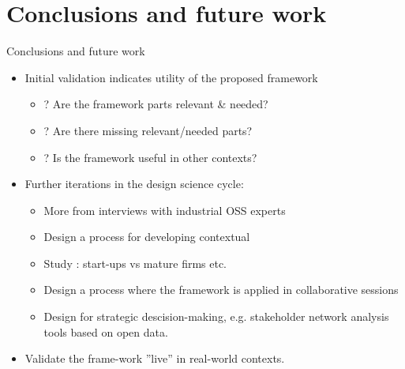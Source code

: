 \documentclass{slideclass}
\begin{document}
\section{Conclusions and future work}
\begin{Slide}{Conclusions and future work}
\begin{itemize}
\item Initial validation indicates utility of the proposed framework 
\begin{itemize}
\item {}? Are the framework parts relevant \& needed? 
\item {}? Are there missing relevant/needed parts?
\item {}? Is the framework useful in other contexts?
\end{itemize}
\item Further iterations in the design science cycle:
\begin{itemize}
\item More  from interviews with industrial OSS experts
\item Design a process for developing contextual 
\item Study : start-ups vs mature firms etc.
\item Design a  process where the framework is applied in collaborative sessions
\item Design  for strategic descision-making, e.g. stakeholder network analysis tools based on open data.
\end{itemize}
\item Validate the frame-work ''live'' in real-world contexts.
\end{itemize}

\end{Slide}

\bgroup
{}
\begin{frame}[plain]{}
\begin{center}
\Huge{}
\end{center}
\end{frame}
\egroup
\end{document}
